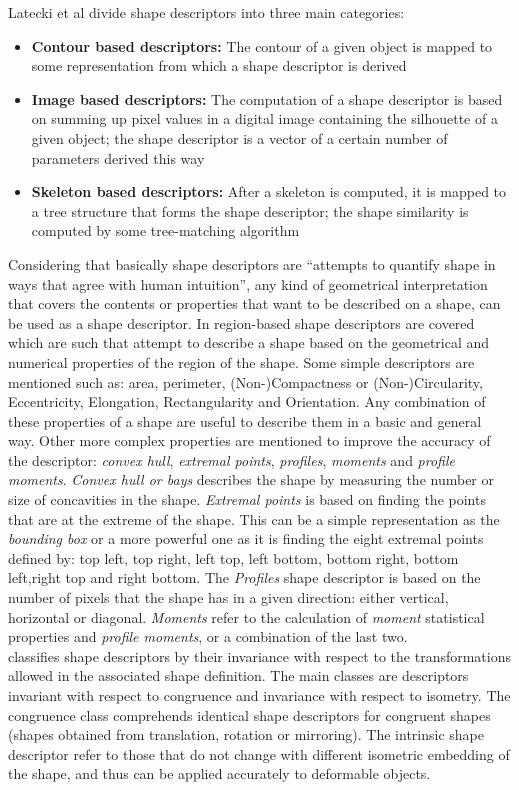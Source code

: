 Latecki et al divide shape descriptors into three
main categories: \cite{shapenonrigid}
\begin{itemize}
\item \textbf{Contour based descriptors: }The contour of a given object is 
mapped to some representation from which a shape descriptor is derived
\item \textbf{Image based descriptors: }The computation of a shape descriptor
is based on summing up pixel values in a digital image containing the silhouette
of a given object; the shape descriptor is a vector of a certain number of
parameters derived this way
\item \textbf{Skeleton based descriptors: }After a skeleton is computed, it is
mapped to a tree structure that forms the shape descriptor; the shape similarity
is computed by some tree-matching algorithm 
\end{itemize}

Considering that basically shape descriptors are ``attempts to quantify shape in 
ways that agree with human intuition''\cite[p.1]{desclecture}, any kind of 
geometrical interpretation that covers the contents or properties that want 
to be described on a shape, can be used as a shape descriptor.
In \cite{desclecture} region-based shape descriptors are covered which are such
that attempt to describe a shape based on the geometrical and numerical properties
of the region of the shape. Some simple descriptors are mentioned such as:
area, perimeter, (Non-)Compactness or (Non-)Circularity, Eccentricity, Elongation,
Rectangularity and Orientation. Any combination of these properties of a shape are
useful to describe them in a basic and general way.
Other more complex properties are mentioned to improve the accuracy of the 
descriptor: \emph{convex hull}, \emph{extremal points}, \emph{profiles},
\emph{ moments} and \emph{profile moments}. \emph{Convex hull or bays} 
describes the shape by measuring the number or size of concavities in the 
shape. \emph{Extremal points} is based on finding the points that
are at the extreme of the shape. This can be a simple representation as the 
\emph{bounding box} or a more powerful one as it is finding the eight extremal
points defined by: top left, top right, left top, left bottom, bottom right,
bottom left,right top and right bottom. The \emph{Profiles} shape descriptor 
is based on the number of pixels that the shape has in a given direction:
 either vertical, horizontal or diagonal. \emph{Moments} refer to the
 calculation of \emph{moment} statistical properties and 
\emph{profile moments}, or a combination of the last two.\\
\cite{web:wikishape} classifies shape descriptors by their
invariance with respect to the transformations allowed in the associated
shape definition. The main classes are descriptors invariant with respect 
to congruence and invariance with respect to isometry. The congruence class
comprehends identical shape descriptors for congruent shapes 
(shapes obtained from
translation, rotation or mirroring). The intrinsic shape descriptor refer
to those that do not change with different isometric embedding of the shape,
and thus can be applied accurately to deformable objects.

